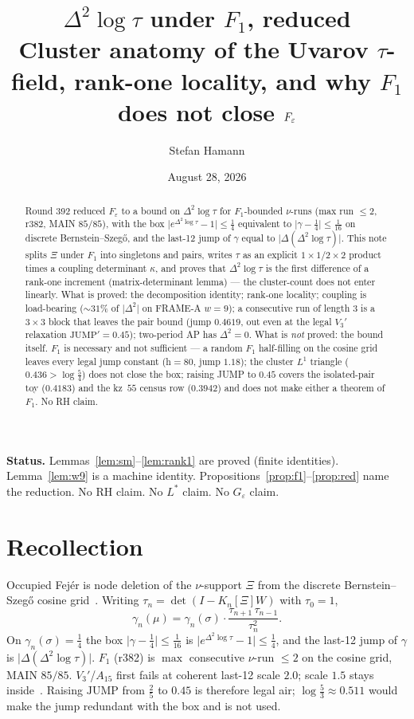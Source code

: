 \documentclass[11pt]{article}
\title{\bfseries $\Delta^2\log\tau$ under $F_1$, reduced\\[2mm]
\large Cluster anatomy of the Uvarov $\tau$-field,
rank-one locality, and why $F_1$ does not close $F_\eps$}
\author{Stefan Hamann}
\date{August 28, 2026}
\theoremstyle{remark}
\newcommand{\eps}{\varepsilon}
\begin{document}
\maketitle

\begin{abstract}\noindent
Round 392 reduced $F_\eps$ to a bound on $\Delta^2\log\tau$ for
$F_1$-bounded $\nu$-runs (max run $\le 2$, r382, MAIN $85/85$),
with the box $\lvert e^{\Delta^2\log\tau}-1\rvert\le\tfrac14$
equivalent to $\lvert\gamma-\tfrac14\rvert\le\tfrac1{16}$ on
discrete Bernstein--Szeg\H{o}, and the last-12 jump of $\gamma$
equal to $\lvert\Delta(\Delta^2\log\tau)\rvert$.
This note splits $\Xi$ under $F_1$ into singletons and pairs,
writes $\tau$ as an explicit $1\times1$/$2\times2$ product times
a coupling determinant $\kappa$, and proves that $\Delta^2\log\tau$
is the first difference of a rank-one increment
(matrix-determinant lemma) --- the cluster-count does not enter
linearly.
What is proved: the decomposition identity; rank-one locality;
coupling is load-bearing ($\sim 31\%$ of $\lvert\Delta^2\rvert$ on
FRAME-A $w=9$); a consecutive run of length $3$ is a $3\times3$
block that leaves the pair bound (jump $0.4619$, out even at the
legal $V_3'$ relaxation $\mathrm{JUMP}'=0.45$);
two-period AP has $\Delta^2=0$.
What is \emph{not} proved: the bound itself.
$F_1$ is necessary and not sufficient --- a random $F_1$
half-filling on the cosine grid leaves every legal jump
constant (h$=80$, jump $1.18$); the cluster $L^1$ triangle
($0.436>\log\tfrac54$) does not close the box; raising JUMP to
$0.45$ covers the isolated-pair toy ($0.4183$) and the kz~$55$
census row ($0.3942$) and does not make either a theorem of $F_1$.
No RH claim.
\end{abstract}

\medskip\noindent
\textbf{Status.}\enspace
Lemmas~\ref{lem:sm}--\ref{lem:rank1} are proved (finite identities).
Lemma~\ref{lem:w9} is a machine identity.
Propositions~\ref{prop:f1}--\ref{prop:red} name the reduction.
No RH claim.  No $L^*$ claim.  No $G_\varepsilon$ claim.

\section{Recollection}\label{sec:rec}

Occupied Fej\'er is node deletion of the $\nu$-support $\Xi$ from
the discrete Bernstein--Szeg\H{o} cosine grid~\cite{r392,r390}.
Writing $\tau_n=\det(I-K_n[\Xi]W)$ with $\tau_0=1$,
\[
\gamma_n(\mu)
=
\gamma_n(\sigma)
\cdot
\frac{\tau_{n+1}\,\tau_{n-1}}{\tau_n^2}.
\]
On $\gamma_n(\sigma)=\tfrac14$ the box
$\lvert\gamma-\tfrac14\rvert\le\tfrac1{16}$ is
$\lvert e^{\Delta^2\log\tau}-1\rvert\le\tfrac14$, and the last-12
jump of $\gamma$ is $\lvert\Delta(\Delta^2\log\tau)\rvert$.
$F_1$ (r382) is $\max$ consecutive $\nu$-run $\le 2$ on the cosine
grid, MAIN $85/85$.
$V_3'$/$A_{15}$ first fails at coherent last-12 scale $2.0$;
scale $1.5$ stays inside~\cite{v3p}.
Raising $\mathrm{JUMP}$ from $\tfrac25$ to $0.45$ is therefore
legal air; $\log\tfrac53\approx 0.511$ would make the jump
redundant with the box and is not used.
\end{document}
